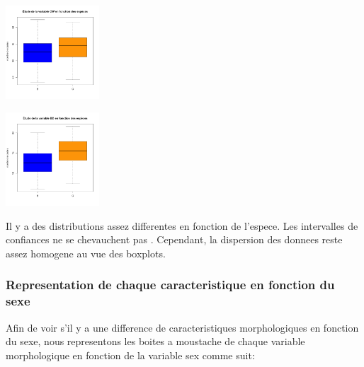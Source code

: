 \documentclass[]{report}
\begin{document}
\begin{center}
	\begin{minipage}[t]{0.3\textwidth}
		\includegraphics[width=35mm]{Figures/Crabs/bxp_sp_cw.png}	
	\end{minipage}
	\begin{minipage}[t]{0.3\textwidth}
		\includegraphics[width=35mm]{Figures/Crabs/bxp_sp_bd.png}
	\end{minipage}
\end{center}

Il y a des distributions assez differentes en fonction de l'espece. Les intervalles de confiances ne se chevauchent pas . Cependant, la dispersion des donnees reste assez homogene au vue des boxplots.
\subsubsection{Representation de chaque caracteristique en fonction du sexe}

Afin de voir s'il y a une difference de caracteristiques morphologiques en fonction du sexe, nous representons les boites a moustache de chaque variable morphologique en fonction de la variable sex comme suit:
\end{document}
